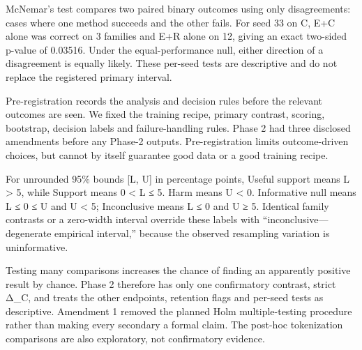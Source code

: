 McNemar's test compares two paired binary outcomes using only disagreements: cases where one method succeeds and the other fails. For seed 33 on C, E+C alone was correct on 3 families and E+R alone on 12, giving an exact two-sided p-value of 0.03516. Under the equal-performance null, either direction of a disagreement is equally likely. These per-seed tests are descriptive and do not replace the registered primary interval.

\medskip{}\par\nopagebreak

Pre-registration records the analysis and decision rules before the relevant outcomes are seen. We fixed the training recipe, primary contrast, scoring, bootstrap, decision labels and failure-handling rules. Phase 2 had three disclosed amendments before any Phase-2 outputs. Pre-registration limits outcome-driven choices, but cannot by itself guarantee good data or a good training recipe.

\medskip{}\par\nopagebreak

For unrounded 95\% bounds [L, U] in percentage points, Useful support means L > 5, while Support means 0 < L ≤ 5. Harm means U < 0. Informative null means L ≤ 0 ≤ U and U < 5; Inconclusive means L ≤ 0 and U ≥ 5. Identical family contrasts or a zero-width interval override these labels with “inconclusive—degenerate empirical interval,” because the observed resampling variation is uninformative.

\medskip{}\par\nopagebreak

Testing many comparisons increases the chance of finding an apparently positive result by chance. Phase 2 therefore has only one confirmatory contrast, strict Δ\_C, and treats the other endpoints, retention flags and per-seed tests as descriptive. Amendment 1 removed the planned Holm multiple-testing procedure rather than making every secondary a formal claim. The post-hoc tokenization comparisons are also exploratory, not confirmatory evidence.

\medskip{}\par\nopagebreak

